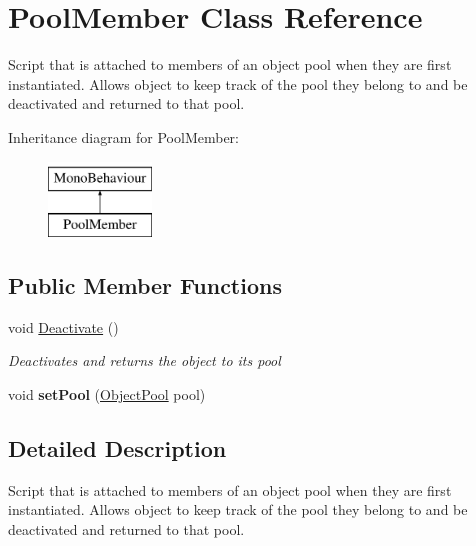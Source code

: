 \hypertarget{class_pool_member}{}\section{Pool\+Member Class Reference}
\label{class_pool_member}


Script that is attached to members of an object pool when they are first instantiated. Allows object to keep track of the pool they belong to and be deactivated and returned to that pool.  


Inheritance diagram for Pool\+Member\+:\begin{figure}[H]
\begin{center}
\leavevmode
\includegraphics[height=2.000000cm]{class_pool_member}
\end{center}
\end{figure}
\subsection*{Public Member Functions}
\begin{DoxyCompactItemize}
\item 
void \hyperlink{class_pool_member_a6f883eaed133e4b288a3847aea3ff33a}{Deactivate} ()
\begin{DoxyCompactList}\small\item\em Deactivates and returns the object to its pool \end{DoxyCompactList}\item 
void {\bfseries set\+Pool} (\hyperlink{class_object_pool}{Object\+Pool} pool)\hypertarget{class_pool_member_aa20f1ac6e12b3d7d3b6f71d49e0cd1af}{}\label{class_pool_member_aa20f1ac6e12b3d7d3b6f71d49e0cd1af}

\end{DoxyCompactItemize}


\subsection{Detailed Description}
Script that is attached to members of an object pool when they are first instantiated. Allows object to keep track of the pool they belong to and be deactivated and returned to that pool. 



